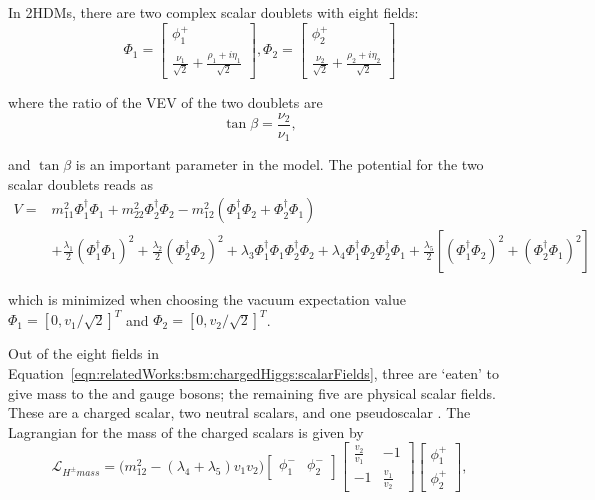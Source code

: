 In 2HDMs, there are two complex scalar doublets with eight fields:
\begin{equation}
	\Phi_1 = \begin{bmatrix} \phi_1^+ \\ \frac{\nu_1}{\sqrt{2}} + \frac{\rho_1+i\eta_1}{\sqrt{2}}  \end{bmatrix} , 
    \Phi_2 = \begin{bmatrix} \phi_2^+ \\ \frac{\nu_2}{\sqrt{2}} + \frac{\rho_2+i\eta_2}{\sqrt{2}}  \end{bmatrix}
    \label{eqn:relatedWorks:bsm:chargedHiggs:scalarFields}
\end{equation}

\noindent where the ratio of the VEV of the two doublets are
\begin{equation}
\tan \beta = \frac{\nu_2}{\nu_1},
\end{equation}

\noindent and $\tan \beta$  is an important parameter in the model. The potential for the two scalar doublets reads as
\begin{equation}
\begin{split}
V=& m_{11}^2 \Phi_1^\dagger \Phi_1 + m_{22}^2 \Phi_2^\dagger \Phi_2 - m_{12}^2 ( \Phi_1^\dagger \Phi_2+\Phi_2^\dagger \Phi_1) \\
&  +\frac{\lambda_1}{2}(\Phi_1^\dagger \Phi_1)^2 +\frac{\lambda_2}{2}(\Phi_2^\dagger \Phi_2)^2
+\lambda_3 \Phi_1^\dagger \Phi_1 \Phi_2^\dagger \Phi_2 +\lambda_4 \Phi_1^\dagger \Phi_2 \Phi_2^\dagger \Phi_1
+\frac{\lambda_5}{2}[ (\Phi_1^\dagger \Phi_2)^2 + (\Phi_2^\dagger \Phi_1)^2 ]
\end{split}
\end{equation}

\noindent which is minimized when choosing the vacuum expectation value $\Phi_1= [0,v_1/\sqrt{2}]^T$ and $\Phi_2= [0,v_2/\sqrt{2}]^T$.



\noindent Out of the eight fields in Equation~\ref{eqn:relatedWorks:bsm:chargedHiggs:scalarFields}, three are ‘eaten’ to give mass to the \PW and \PZ gauge bosons; the remaining five are physical scalar fields. These are a charged scalar, two neutral scalars, and one pseudoscalar \cite{BRANCO20121}. The Lagrangian for the mass of the charged scalars is given by
\begin{equation}
	\mathcal{L}_{H^{\pm} mass} = \big( m_{12}^2 -(\lambda_4+\lambda_5) v_1 v_2 \big) 
    \begin{bmatrix} \phi_1^- & \phi_2^-  \end{bmatrix}
    \begin{bmatrix} \frac{v_2}{v_1} & -1 \\ -1 & \frac{v_1}{v_2} \end{bmatrix}
    \begin{bmatrix} \phi_1^+ \\ \phi_2^+ \end{bmatrix} ,
\end{equation}

